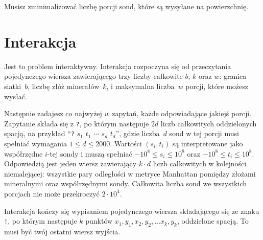Musisz zminimalizować liczbę porcji sond, które są wysyłane na powierzchnię.


\section*{Interakcja}

Jest to problem interaktywny.
Interakcja rozpoczyna się od przeczytania pojedynczego wiersza zawierającego trzy liczby całkowite $b$, $k$ oraz $w$:
granica siatki~$b$,
liczbę złóż minerałów~$k$,
i maksymalna liczba~$w$ porcji, które możesz wysłać.

Następnie zadajesz co najwyżej $w$ zapytań, każde odpowiadające jakiejś porcji.
Zapytanie składa się z \texttt{?}, po którym następuje $2d$ liczb całkowitych oddzielonych spacją, na przykład ``\texttt{?} $s_1$ $t_1$ $\cdots$ $s_d$ $t_d$'', gdzie liczba~$d$ sond w tej porcji musi spełniać wymagania
$1\leq d\leq 2000$. %
Wartości $(s_i,t_i)$ są interpretowane jako współrzędne $i$-tej sondy i muszą spełniać
$-10^8 \leq s_i \leq 10^8$ oraz $-10^8 \leq t_i \leq 10^8$. %
Odpowiedzią jest jeden wiersz zawierający $k \cdot d$ liczb całkowitych w kolejności niemalejącej: wszystkie pary odległości w metryce Manhattan pomiędzy złożami mineralnymi oraz współrzędnymi sondy.
Całkowita liczba sond we wszystkich porcjach nie może przekroczyć
$2\cdot 10^4.$ %

Interakcja kończy się wypisaniem pojedynczego wiersza składającego się ze znaku \texttt{!}, po którym następuje $k$ punktów $x_1, y_1, x_2, y_2, \ldots x_k, y_k$, oddzielone spacją.
To musi być twój ostatni wiersz wyjścia.

